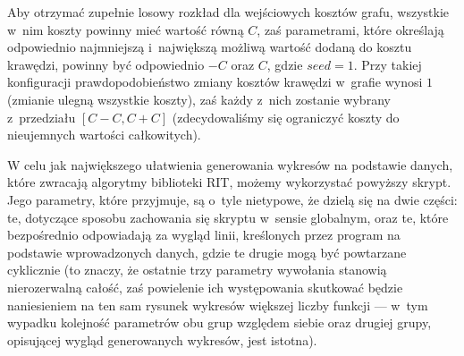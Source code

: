 Aby otrzymać zupełnie losowy rozkład dla wejściowych kosztów grafu, wszystkie w~nim koszty powinny mieć wartość równą $C$, zaś parametrami, które określają odpowiednio najmniejszą i~największą możliwą wartość dodaną do kosztu krawędzi, powinny być odpowiednio $-C$ oraz $C$, gdzie $seed = 1$. Przy takiej konfiguracji prawdopodobieństwo zmiany kosztów krawędzi w~grafie wynosi $1$ (zmianie ulegną wszystkie koszty), zaś każdy z~nich zostanie wybrany z~przedziału $\left[ C - C, C + C \right]$ (zdecydowaliśmy się ograniczyć koszty do nieujemnych wartości całkowitych).


W celu jak największego ułatwienia generowania wykresów na podstawie danych, które zwracają algorytmy biblioteki \textsc{RIT}, możemy wykorzystać powyższy skrypt. Jego parametry, które przyjmuje, są o~tyle nietypowe, że dzielą się na dwie części: te, dotyczące sposobu zachowania się skryptu w~sensie globalnym, oraz te, które bezpośrednio odpowiadają za wygląd linii, kreślonych przez program na podstawie wprowadzonych danych, gdzie te drugie mogą być powtarzane cyklicznie (to znaczy, że ostatnie trzy parametry wywołania stanowią nierozerwalną całość, zaś powielenie ich występowania skutkować będzie naniesieniem na ten sam rysunek wykresów większej liczby funkcji --- w~tym wypadku kolejność parametrów obu grup względem siebie oraz drugiej grupy, opisującej wygląd generowanych wykresów, jest istotna).


